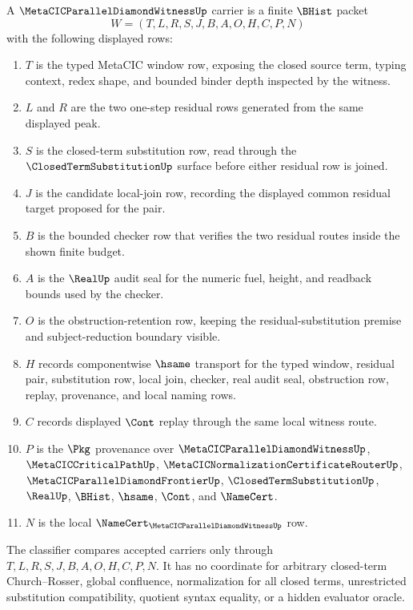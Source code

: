 \begin{definition}
\label{def:metacic-parallel-diamond-witness-carrier}
A $\MetaCICParallelDiamondWitnessUp$ carrier is a finite $\BHist$ packet
$$
W=(T,L,R,S,J,B,A,O,H,C,P,N)
$$
with the following displayed rows:
\begin{enumerate}
\item $T$ is the typed MetaCIC window row, exposing the closed source term, typing context, redex shape, and bounded binder depth inspected by the witness.
\item $L$ and $R$ are the two one-step residual rows generated from the same displayed peak.
\item $S$ is the closed-term substitution row, read through the $\ClosedTermSubstitutionUp$ surface before either residual row is joined.
\item $J$ is the candidate local-join row, recording the displayed common residual target proposed for the pair.
\item $B$ is the bounded checker row that verifies the two residual routes inside the shown finite budget.
\item $A$ is the $\RealUp$ audit seal for the numeric fuel, height, and readback bounds used by the checker.
\item $O$ is the obstruction-retention row, keeping the residual-substitution premise and subject-reduction boundary visible.
\item $H$ records componentwise $\hsame$ transport for the typed window, residual pair, substitution row, local join, checker, real audit seal, obstruction row, replay, provenance, and local naming rows.
\item $C$ records displayed $\Cont$ replay through the same local witness route.
\item $P$ is the $\Pkg$ provenance over $\MetaCICParallelDiamondWitnessUp$, $\MetaCICCriticalPathUp$, $\MetaCICNormalizationCertificateRouterUp$, $\MetaCICParallelDiamondFrontierUp$, $\ClosedTermSubstitutionUp$, $\RealUp$, $\BHist$, $\hsame$, $\Cont$, and $\NameCert$.
\item $N$ is the local $\NameCert_{\MetaCICParallelDiamondWitnessUp}$ row.
\end{enumerate}
The classifier compares accepted carriers only through $T,L,R,S,J,B,A,O,H,C,P,N$. It has no coordinate for arbitrary closed-term Church--Rosser, global confluence, normalization for all closed terms, unrestricted substitution compatibility, quotient syntax equality, or a hidden evaluator oracle.
\end{definition}

